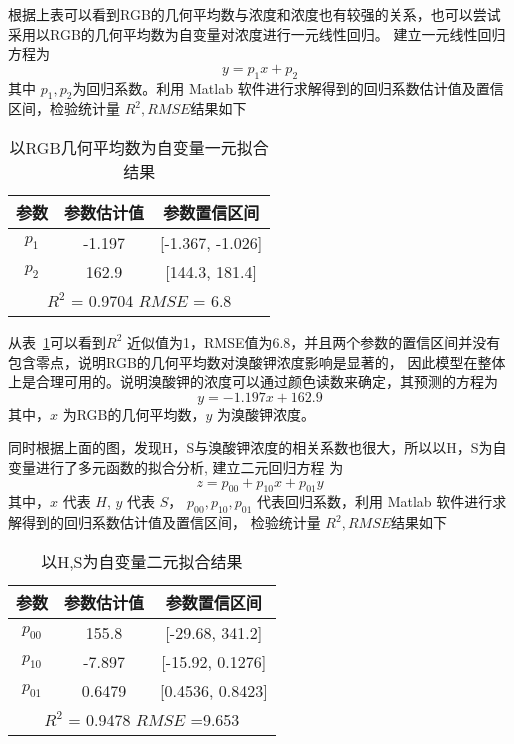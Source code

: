     根据上表可以看到RGB的几何平均数与浓度和浓度也有较强的关系，也可以尝试采用以RGB的几何平均数为自变量对浓度进行一元线性回归。
    建立一元线性回归方程为
     $$ y = p_1 x + p_2$$
    其中 $p_1, p_2$为回归系数。利用 Matlab 软件进行求解得到的回归系数估计值及置信区间，检验统计量 $R^2, RMSE $结果如下

    \begin{table}[H]
        \centering
        \caption{以RGB几何平均数为自变量一元拟合结果}
        \label{RGB拟合}
        \begin{tabular}{@{}ccc@{}}
        \toprule
        参数        & 参数估计值     & 参数置信区间                  \\ \midrule
        $p_1$     & -1.197    & {[}-1.367, -1.026{]}    \\
        $p_2$     & 162.9     & {[}144.3, 181.4{]}      \\
        \hline
        \multicolumn{3}{c}{$R^2$ = 0.9704 $RMSE$ = 6.8} \\ \bottomrule
        \end{tabular}
        \end{table}

    从表~\ref{RGB拟合}可以看到$R^2$ 近似值为1，RMSE值为6.8，并且两个参数的置信区间并没有包含零点，说明RGB的几何平均数对溴酸钾浓度影响是显著的，
    因此模型在整体上是合理可用的。说明溴酸钾的浓度可以通过颜色读数来确定，其预测的方程为
    $$ y = -1.197 x + 162.9 $$
    其中，$x$ 为RGB的几何平均数，$y$ 为溴酸钾浓度。

    同时根据上面的图，发现H，S与溴酸钾浓度的相关系数也很大，所以以H，S为自变量进行了多元函数的拟合分析,
    建立二元回归方程 为
    $$ z = p_{00} + p_{10} x + p_{01} y$$
    其中，$x$ 代表 $H$, $y$ 代表 $S$， $p_{00},p_{10},p_{01}$ 代表回归系数，利用 Matlab 软件进行求解得到的回归系数估计值及置信区间，
    检验统计量 $R^2, RMSE $结果如下

    \begin{table}[H]
        \centering
        \caption{以H,S为自变量二元拟合结果}
        \label{二元拟合结果}
        \begin{tabular}{@{}ccc@{}}
        \toprule
        参数         & 参数估计值     & 参数置信区间                  \\ \midrule
        $p_00$     & 155.8     & {[}-29.68, 341.2{]}     \\
        $p_10$     & -7.897    & {[}-15.92, 0.1276{]}    \\
        $p_01$     & 0.6479    & {[}0.4536, 0.8423{]}    \\
        \hline
        \multicolumn{3}{c}{$R^2$ = 0.9478 $RMSE$ =9.653} \\ \bottomrule
        \end{tabular}
        \end{table}

